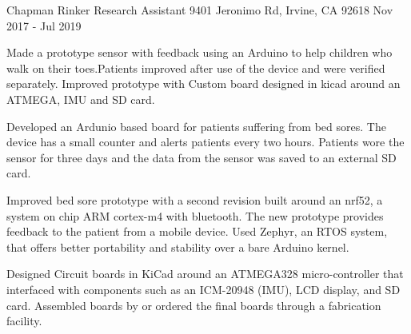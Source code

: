 \begin{cventries}
    

  \cventry
    {Chapman Rinker} %
    {Research Assistant} %
    {9401 Jeronimo Rd, Irvine, CA 92618} %
    {Nov 2017 - Jul 2019} %
    {
      \begin{cvitems} %
      \item{Made a prototype sensor with feedback using an Arduino to help children who walk on their toes.Patients improved after use of the device and were verified separately. Improved prototype with Custom board designed in kicad around an ATMEGA, IMU and SD card.  }
      \item{Developed an Ardunio based board for patients suffering from bed sores. The device has a small counter and alerts patients every two hours. Patients wore the sensor for three days and the data from the sensor was saved to an external SD card.}
      \item{Improved bed sore prototype with a second revision built around an nrf52, a system on chip ARM cortex-m4 with bluetooth. The new prototype provides feedback to the patient from a mobile device. Used Zephyr, an RTOS system, that offers better portability and stability over a bare Arduino kernel.}
      \item{Designed Circuit boards in KiCad around an ATMEGA328 micro-controller that interfaced with components such as an  ICM-20948 (IMU), LCD display, and SD card. Assembled boards by or ordered the final boards through a fabrication facility.}

\end{cvitems}}
\end{cventries}
